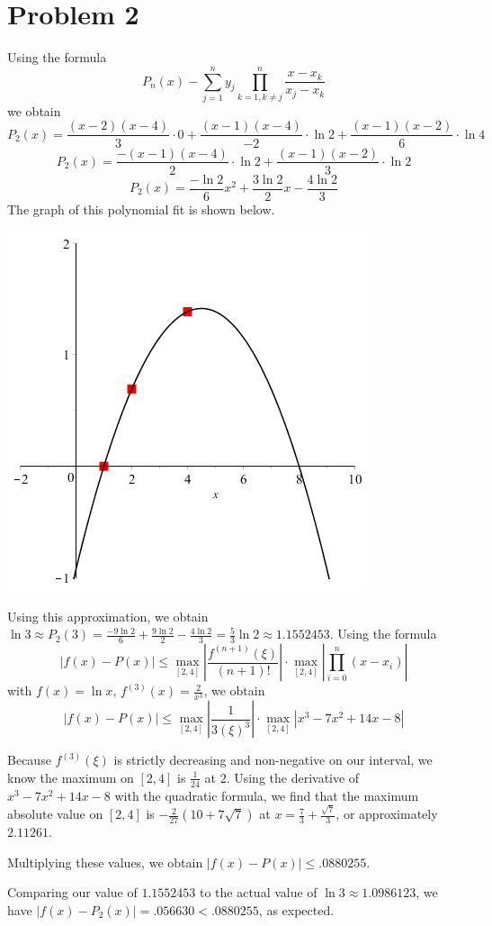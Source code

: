 \documentclass[11pt]{article} %
\begin{document}
\section*{Problem 2}
Using the formula $$P_n(x) - \sum_{j=1}^n y_j \prod_{k=1, k \neq j}^n \frac{x-x_k}{x_j - x_k}$$
we obtain
	$$P_2(x) = \frac{(x-2)(x-4)}{3}\cdot 0 + \frac{(x-1)(x-4)}{-2}\cdot \ln2 + \frac{(x-1)(x-2)}{6} \cdot \ln4 $$
	$$P_2(x) =  \frac{-(x-1)(x-4)}{2}\cdot \ln2 + \frac{(x-1)(x-2)}{3} \cdot \ln2 $$
	$$P_2(x) =  \frac{-\ln2}{6}x^2 + \frac{3\ln2}{2}x -  \frac{4\ln2}{3} $$
The graph of this polynomial fit is shown below.
\begin{center}
\includegraphics[scale=.5]{plots/problem2plot1.png}
\end{center}
\par Using this approximation, we obtain $\ln 3 \approx P_2(3) =  \frac{-9\ln2}{6} + \frac{9\ln2}{2} -  \frac{4\ln2}{3} = \frac{5}{3} \ln 2 \approx 1.1552453$.
Using the formula
	$$|f(x) - P(x)|\leq \max_{[2,4]}\left| \frac{f^{(n+1)}( \xi)}{(n+1)!} \right| \cdot  \max_{[2,4]} \left| \prod_{i=0}^n(x-x_i) \right|$$
with $f(x) = \ln x$, $f^{(3)}(x) = \frac{2}{x^3}$, we obtain
	$$|f(x) - P(x)|\leq \max_{[2,4]}\left| \frac{1}{3 (\xi)^3} \right| \cdot \max_{[2,4]}  \left| x^3 - 7x^2 + 14x - 8 \right|$$
\par Because $f^{(3)}(\xi)$ is strictly decreasing and non-negative on our interval, we know the maximum on $[2,4]$ is $\frac{1}{24}$ at $2$. Using the derivative of $ x^3 - 7x^2 + 14x - 8$
with the quadratic formula, we find that the maximum absolute value on $[2,4]$ is $-\frac{2}{27}(10 + 7\sqrt7)$ at $x = \frac{7}{3}+\frac{\sqrt7}{3}$, or approximately $2.11261$.
\par Multiplying these values, we obtain $|f(x) - P(x)| \leq .0880255$. \\
\par Comparing our value of  $1.1552453$ to the actual value of $\ln 3 \approx 1.0986123$, we have $|f(x) - P_2(x)| = .056630 < .0880255$, as expected.
\par
\end{document}
